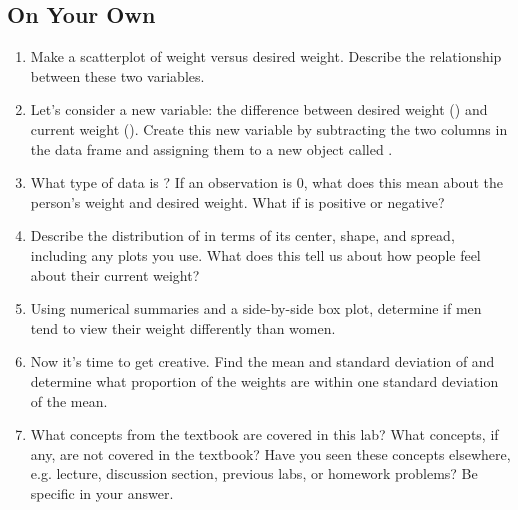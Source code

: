 \documentclass[11pt]{article}
\begin{document}
\vfill

\subsection*{On Your Own}

\begin{enumerate}
\item Make a scatterplot of weight versus desired weight. Describe the relationship between these two variables.
\item Let's consider a new variable: the difference between desired weight (\texttt{}) and current weight (\texttt{}). Create this new variable by subtracting the two columns in the data frame and assigning them to a new object called \texttt{}.
\item What type of data is \texttt{}? If an observation \texttt{} is 0, what does this mean about the person's weight and desired weight. What if \texttt{} is positive or negative?
\item Describe the distribution of \texttt{} in terms of its center, shape, and spread, including any plots you use. What does this tell us about how people feel about their current weight?
\item Using numerical summaries and a side-by-side box plot, determine if men tend to view their weight differently than women.
\item Now it's time to get creative. Find the mean and standard deviation of \texttt{} and determine what proportion of the weights are within one standard deviation of the mean.
\item What concepts from the textbook are covered in this lab?  What concepts, if any, are not covered in the textbook?  Have you seen these concepts elsewhere, e.g. lecture, discussion section, previous labs, or homework problems?  Be specific in your answer.
\end{enumerate}
\end{document}
